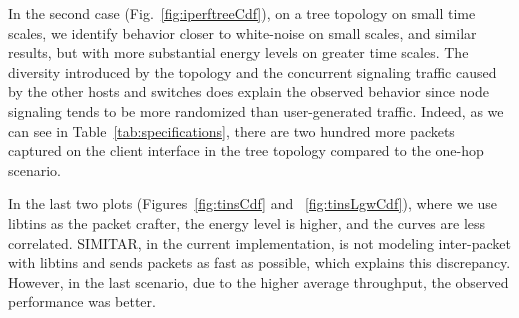 In the second case (Fig.~\ref{fig:iperftreeCdf}), on a tree topology on small time scales, we identify behavior closer to white-noise on small scales, and similar results, but with more substantial energy levels on greater time scales. The diversity introduced by the topology and the concurrent signaling traffic caused by the other hosts and switches does explain the observed behavior since node signaling tends to be more randomized than user-generated traffic. Indeed, as we can see in Table~\ref{tab:specifications}, there are two hundred more packets captured on the client interface in the tree topology compared to the one-hop scenario. 

In the last two plots (Figures~\ref{fig:tinsCdf} and ~\ref{fig:tinsLgwCdf}), where we use libtins as the packet crafter, the energy level is higher, and the curves are less correlated. SIMITAR, in the current implementation, is not modeling inter-packet with libtins and sends packets as fast as possible, which explains this discrepancy. However, in the last scenario, due to the higher average throughput, the observed performance was better.


